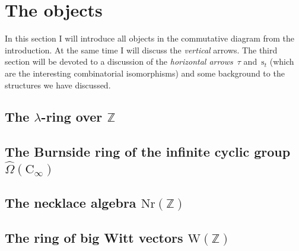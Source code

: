 \section{The objects}
In this section I will introduce all objects in the commutative diagram from the introduction. At the same time I will discuss the \emph{vertical} arrows. The third section will be devoted to a discussion of the \emph{horizontal arrows}~$\tau$ and~$\mathrm{s}_t$ (which are the interesting combinatorial isomorphisms) and some background to the structures we have discussed.

\subsection{The $\lambda$-ring over $\mathbb{Z}$}


\subsection{The Burnside ring of the infinite cyclic group $\hat{\Omega}(\mathrm{C}_\infty)$}


\subsection{The necklace algebra $\mathrm{Nr}(\mathbb{Z})$}


\subsection{The ring of big Witt vectors $\mathrm{W}(\mathbb{Z})$}
